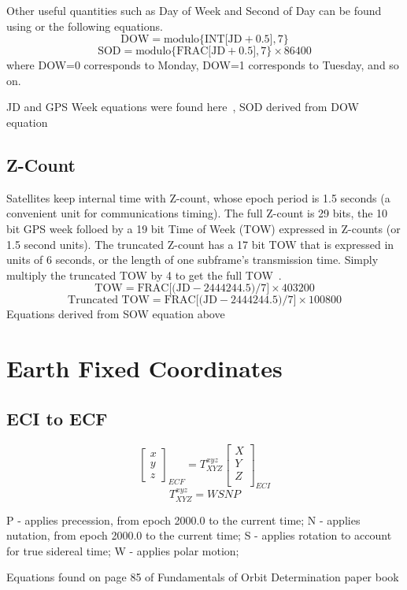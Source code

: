 Other useful quantities such as Day of Week and  Second of Day can be found using  or the following equations.
\[\mbox{DOW}=\mbox{modulo\{INT[JD}+0.5],7\}\]
\[\mbox{SOD}=\mbox{modulo\{FRAC[JD}+0.5],7\}\times 86400\]
where DOW=0 corresponds to Monday, DOW=1 corresponds to Tuesday, and so on.

JD and GPS Week equations were found here~\cite[pp. 36-37]{hlc:gtp}, SOD derived from DOW equation
\subsection{Z-Count}
Satellites keep internal time with Z-count, whose epoch period is 1.5 seconds (a convenient unit for communications timing). The full Z-count is 29 bits, the 10 bit GPS week folloed by a 19 bit Time of Week (TOW) expressed in Z-counts (or 1.5 second units). The truncated Z-count has a 17 bit TOW that is expressed in units of 6 seconds, or the length of one subframe's transmission time. Simply multiply the truncated TOW by 4 to get the full TOW~\cite[pp. 86-88]{tsui:fgpsr}.
\[ \mbox{TOW}=\mbox{FRAC[(JD}-2444244.5)/7]\times 403200 \]
\[ \mbox{Truncated TOW}=\mbox{FRAC[(JD}-2444244.5)/7]\times 100800 \]
Equations derived from SOW equation above
\section{Earth Fixed Coordinates}
\subsection{ECI to ECF}
\[\left[\begin{array}{c} x \\ y \\ z \end{array}\right]_{ECF}=T_{XYZ}^{xyz}\left[\begin{array}{c} X \\ Y \\ Z \\ \end{array}\right]_{ECI}\]
\[T_{XYZ}^{xyz}=WSNP\]

P - applies precession, from epoch 2000.0 to the current time;
N - applies nutation, from epoch 2000.0 to the current time;
S - applies rotation to account for true sidereal time;
W - applies polar motion;

Equations found on page 85 of Fundamentals of Orbit Determination paper book

